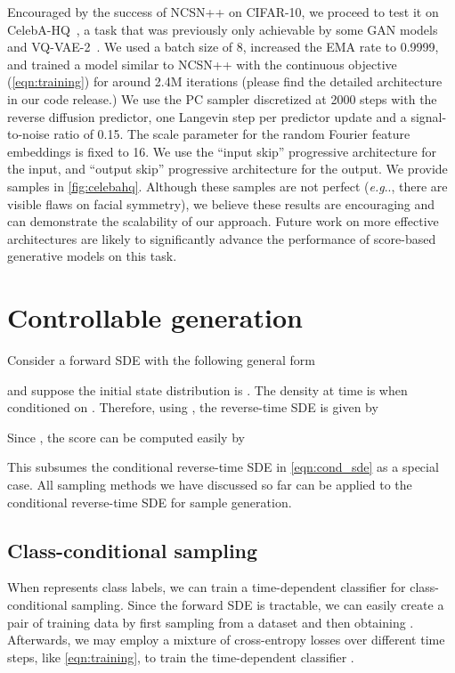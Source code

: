 \documentclass{article} \usepackage{iclr2021_conference,times}
\makeatletter
\def\@onedot{\ifx\@let@token.\else.\null\fi\xspace}
\DeclareRobustCommand\onedot{\futurelet\@let@token\@onedot}
\def\eg{\emph{e.g}\onedot}
\makeatother
\begin{document}
Encouraged by the success of NCSN++ on CIFAR-10, we proceed to test it on  CelebA-HQ~\citep{karras2018progressive}, a task that was previously only achievable by some GAN models and VQ-VAE-2~\citep{razavi2019generating}. We used a batch size of 8, increased the EMA rate to 0.9999, and trained a model similar to NCSN++ with the continuous objective (\cref{eqn:training}) for around 2.4M iterations (please find the detailed architecture in our code release.) We use the PC sampler discretized at 2000 steps with the reverse diffusion predictor, one Langevin step per predictor update and a signal-to-noise ratio of 0.15. The scale parameter for the random Fourier feature embeddings is fixed to 16. We use the ``input skip'' progressive architecture for the input, and ``output skip'' progressive architecture for the output. We provide samples in \cref{fig:celebahq}. Although these samples are not perfect (\eg, there are visible flaws on facial symmetry), we believe these results are encouraging and can demonstrate the scalability of our approach. Future work on more effective architectures are likely to significantly advance the performance of score-based generative models on this task.


\section{Controllable generation}\label{app:cond_gen}
Consider a forward SDE with the following general form

and suppose the initial state distribution is . The density at time  is  when conditioned on . Therefore, using \citet{Anderson1982-ny}, the reverse-time SDE is given by

Since , the score  can be computed easily by

This subsumes the conditional reverse-time SDE in \cref{eqn:cond_sde} as a special case. All sampling methods we have discussed so far can be applied to the conditional reverse-time SDE for sample generation.

\subsection{Class-conditional sampling}\label{app:class_cond_sampling}
When  represents class labels, we can train a time-dependent classifier  for class-conditional sampling. Since the forward SDE is tractable, we can easily create a pair of training data  by first sampling  from a dataset and then obtaining . Afterwards, we may employ a mixture of cross-entropy losses over different time steps, like \cref{eqn:training}, to train the time-dependent classifier .
\end{document}
